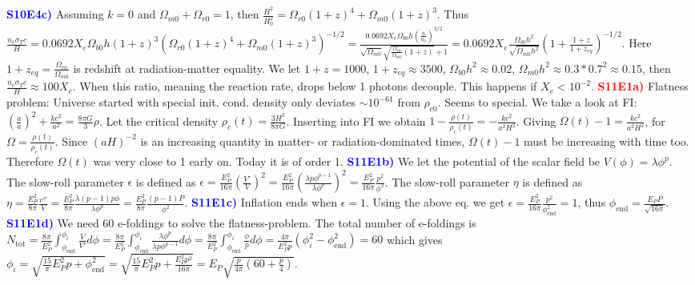 \documentclass[landscape, a4paper,1pt,english]{article}
\begin{document}
{{{\begin{multicols}{5}
\textcolor{blue}{\textbf{S10E4c)}} Assuming $k =0$ and $\Omega_{m0}  + \Omega_{r0} = 1$, then $\frac{H^2}{H_0^2} = \Omega_{r0}(1+z)^4 + \Omega_{m0}(1+z)^3$. Thus $\frac{n_e\sigma_Tc}{H} = 0.0692 X_e\Omega_{b0}h(1+z)^{3}\left(\Omega_{r0}(1+z)^4 + \Omega_{m0}(1+z)^3\right)^{-1/2} = \frac{0.0692 X_e\Omega_{b0}h(\frac{a}{a_0})^{3/2}}{\sqrt{\Omega_{m0}}\sqrt{\frac{\Omega_{r0}}{\Omega_{m0}}(1+z)}+1} = 0.0692X_e\frac{\Omega_{b0}h^2}{\sqrt{\Omega_{m0}h^2}}\left(1+\frac{1+z}{1+z_{eq}}\right)^{-1/2}$. Here $1+z_{eq} = \frac{\Omega_{r0}}{\Omega_{m0}}$ is redshift at radiation-matter equality. We let $1+z = 1000$, $1+z_{eq} \approx3500$, $\Omega_{b0}h^2\approx0.02$, $\Omega_{m0}h^2 \approx0.3*0.7^2\approx0.15$, then $\frac{n_e\sigma_Tc}{H}\approx100X_e$. When this ratio, meaning the reaction rate, drops below 1 photons decouple. This happens if $X_e<10^{-2}$.
\textcolor{red}{\textbf{S11E1a)}} Flatness problem: Universe started with special init. cond. density only deviates $\sim 10^{-61}$ from $\rho_{c0}$. Seems to special. We take a look at FI:
$\left(\frac{\dot{a}}{a}\right)^2 + \frac{kc^2}{a^2} = \frac{8\pi G}{3}\rho$. Let the critical density $\rho_c(t) = \frac{3H^2}{8\pi G}$. Inserting into FI we obtain $1 - \frac{\rho(t)}{\rho_c(t)} = -\frac{kc^2}{a^2H^2}$. Giving $\Omega(t) - 1 = \frac{kc^2}{a^2H^2}$, for $\Omega = \frac{\rho(t)}{\rho_c(t)}$. Since $(aH)^{-2}$ is an increasing quantity in matter- or radiation-dominated times, $\Omega(t) - 1$ must be increasing with time too. Therefore $\Omega(t)$ was very close to 1 early on. Today it is of order 1.
\textcolor{blue}{\textbf{S11E1b)}} We let the potential of the scalar field be $V(\phi) = \lambda \phi^p$. The slow-roll parameter $\epsilon$ is defined as $\epsilon = \frac{E_P^2}{16\pi}\left(\frac{V'}{V}\right)^2 = \frac{E_P^2}{16\pi}\left(\frac{\lambda p\phi^{p - 1}}{\lambda\phi^p}\right)^2 = \frac{E_P^2}{16\pi}\frac{p^2}{\phi^2}$. The slow-roll parameter $\eta$ is defined as 
$\eta = \frac{E_P^2}{8\pi}\frac{v''}{V} = \frac{E_P^2}{8\pi}\frac{\lambda(p-1)p\phi}{\lambda\phi^p} = \frac{E_P^2}{8\pi}\frac{(p-1)P}{\phi^2}$.
\textcolor{blue}{\textbf{S11E1c)}} Inflation ends when $\epsilon = 1$. Using the above eq. we get
$\epsilon = \frac{E_P^2}{16\pi}\frac{p^2}{\phi^2_\text{end}} = 1$, thus $\phi_\text{end} = \frac{E_P P}{\sqrt{16\pi}}$.
\textcolor{blue}{\textbf{S11E1d)}} We need 60 e-foldings to solve the flatness-problem. The total number of e-foldings is $N_\text{tot} = \frac{8\pi}{E_P^2}\int_{\phi_\text{end}}^{\phi_i}\frac{V}{V'}d\phi = \frac{8\pi}{E_P^2}\int_{\phi_\text{end}}^{\phi_i}\frac{\lambda \phi^p}{\lambda p \phi^{p-1}}d\phi = \frac{8\pi}{E_P^2}\int_{\phi_\text{end}}^{\phi_i}\frac{\phi}{p}d\phi = \frac{4\pi}{E_P^2 p}(\phi_i^2 - \phi_\text{end}^2) = 60$ which gives $\phi_i = \sqrt{\frac{15}{\pi}E_P^2p + \phi_\text{end}^2} = \sqrt{\frac{15}{\pi}E_P^2p + \frac{E_P^2p^2}{16\pi}} = E_P\sqrt{\frac{p}{4\pi}(60 + \frac{p}{4})}$.

\end{multicols}}}}
\end{document}
